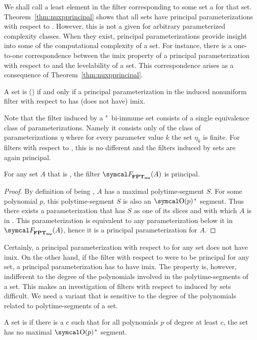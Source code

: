 We shall call a least element in the filter corresponding to some set a  for that set.
Theorem~\ref{thm:nuxpprincipal} shows that all sets have principal parameterizations with respect to .
However, this is not a given for arbitrary parameterized complexity classes.
When they exist, principal parameterizations provide insight into some of the computational complexity of a set.
For instance, there is a one-to-one correspondence between the imix property of a principal parameterization with respect to  and the levelability of a set.
This correspondence arises as a consequence of Theorem~\ref{thm:nuxpprincipal}.
\begin{corollary}
  A set is  () if and only if a principal parameterization in the induced nonuniform filter with respect to  has (does not have) imix.
\end{corollary}

Note that the filter induced by a "~bi-immune set consists of a single equivalence class of parameterizations.
Namely it consists only of the class of parameterizations $\eta$ where for every parameter value $k$ the set $\eta_k$ is finite.
For filters with respect to , this is no different and the filters induced by  sets are again principal.
\begin{theorem}
\label{thm:nufptprincipal}%
  For any set $A$ that is , the filter $\calF_\clnu{FPT}(A)$ is principal.
\end{theorem}
\begin{proof}
  By definition of being , $A$ has a maximal polytime-segment $S$.
  For some polynomial $p$, this polytime-segment $S$ is also an $\bigO(p)$"~segment.
  Thus there exists a parameterization that has $S$ as one of its slices and with which $A$ is in .
  This parameterization is equivalent to any parameterization below it in $\calF_\clnu{FPT}(A)$, hence it is a principal parameterization for $A$.
\end{proof}
%

Certainly, a principal parameterization with respect to  for any  set does not have imix.
On the other hand, if the filter with respect to  were to be principal for any  set, a principal parameterization has to have imix.
The  property is, however, indifferent to the degree of the polynomials involved in the polytime-segments of a set.
This makes an investigation of filters with respect to  induced by  sets difficult.
We need a variant that is sensitive to the degree of the polynomials related to polytime-segments of a set.
\begin{definition}
  A set is  if there is a $c$ such that for all polynomials $p$ of degree at least $c$, the set has no maximal $\bigO(p)$"~segment.
\end{definition}

